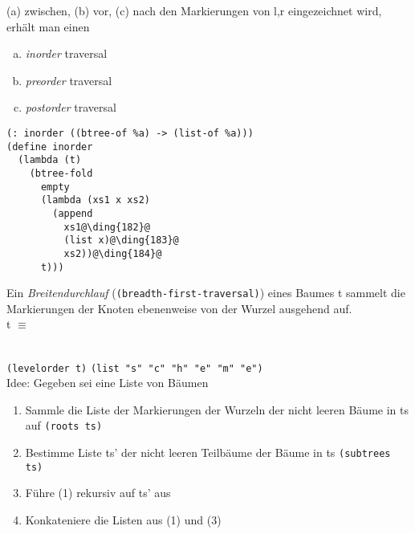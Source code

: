 (a) zwischen, (b) vor, (c) nach den Markierungen von l,r eingezeichnet wird, erhält man einen
\begin{enumerate}[(a)]
\item \emph{inorder} traversal \qquad {}
\item \emph{preorder} traversal \qquad {} 
\item \emph{postorder} traversal \qquad {}
\end{enumerate}
\begin{lstlisting}[literate={}]
(: inorder ((btree-of %a) -> (list-of %a)))
(define inorder
  (lambda (t)
    (btree-fold
      empty
      (lambda (xs1 x xs2)
        (append 
          xs1@\ding{182}@
          (list x)@\ding{183}@
          xs2))@\ding{184}@
      t)))
\end{lstlisting}
Ein \emph{Breitendurchlauf} (\lstinline|(breadth-first-traversal)|) eines Baumes t sammelt die Markierungen der Knoten ebenenweise von der Wurzel ausgehend auf.\\
t $\equiv$ \begin{minipage}[c]{0.9\textwidth}
\end{minipage}\bigskip\\
\lstinline|(levelorder t)| \eval \lstinline|(list "s" "c" "h" "e" "m" "e")|\\
Idee: Gegeben sei eine Liste von Bäumen
\begin{enumerate}[(1)]
\item Sammle die Liste der Markierungen der Wurzeln der nicht leeren Bäume in ts auf \lstinline|(roots ts)|
\item Bestimme Liste ts' der nicht leeren Teilbäume der Bäume in ts \lstinline|(subtrees ts)|
\item Führe (1) rekursiv auf ts' aus
\item Konkateniere die Listen aus (1) und (3)
\end{enumerate}
